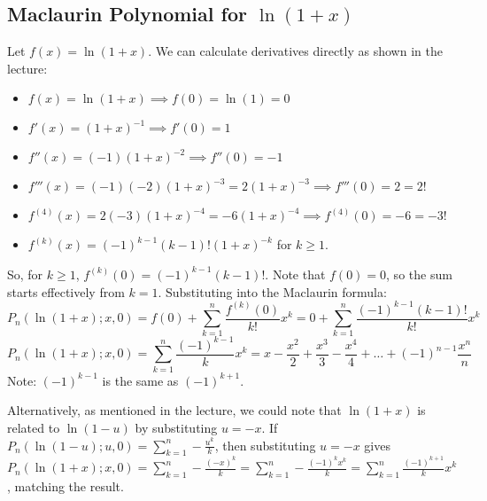 \documentclass[11pt]{article}
\theoremstyle{definition}
\theoremstyle{remark}
\begin{document}
\subsection{Maclaurin Polynomial for \texorpdfstring{$\ln(1+x)$}{ln(1+x)}}
Let $f(x) = \ln(1+x)$. We can calculate derivatives directly as shown in the lecture:
\begin{itemize}
    \item $f(x) = \ln(1+x) \implies f(0) = \ln(1) = 0$
    \item $f'(x) = (1+x)^{-1} \implies f'(0) = 1$
    \item $f''(x) = (-1)(1+x)^{-2} \implies f''(0) = -1$
    \item $f'''(x) = (-1)(-2)(1+x)^{-3} = 2(1+x)^{-3} \implies f'''(0) = 2 = 2!$
    \item $f^{(4)}(x) = 2(-3)(1+x)^{-4} = -6(1+x)^{-4} \implies f^{(4)}(0) = -6 = -3!$
    \item $f^{(k)}(x) = (-1)^{k-1} (k-1)! (1+x)^{-k}$ for $k \ge 1$.
\end{itemize}
So, for $k \ge 1$, $f^{(k)}(0) = (-1)^{k-1} (k-1)!$.
Note that $f(0)=0$, so the sum starts effectively from $k=1$.
Substituting into the Maclaurin formula:
\[ P_n(\ln(1+x); x, 0) = f(0) + \sum_{k=1}^n \frac{f^{(k)}(0)}{k!}x^k = 0 + \sum_{k=1}^n \frac{(-1)^{k-1}(k-1)!}{k!}x^k \]
\[ P_n(\ln(1+x); x, 0) = \sum_{k=1}^n \frac{(-1)^{k-1}}{k}x^k = x - \frac{x^2}{2} + \frac{x^3}{3} - \frac{x^4}{4} + \dots + (-1)^{n-1}\frac{x^n}{n} \]
Note: $(-1)^{k-1}$ is the same as $(-1)^{k+1}$.

Alternatively, as mentioned in the lecture, we could note that $\ln(1+x)$ is related to $\ln(1-u)$ by substituting $u = -x$. If $P_n(\ln(1-u); u, 0) = \sum_{k=1}^n -\frac{u^k}{k}$, then substituting $u=-x$ gives $P_n(\ln(1+x); x, 0) = \sum_{k=1}^n -\frac{(-x)^k}{k} = \sum_{k=1}^n -\frac{(-1)^k x^k}{k} = \sum_{k=1}^n \frac{(-1)^{k+1}}{k} x^k$, matching the result.
\end{document}
